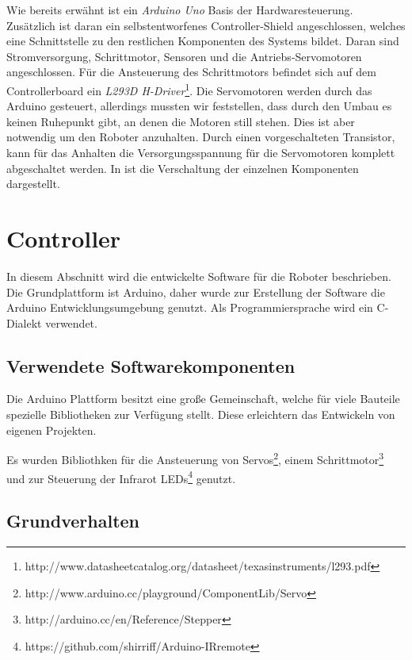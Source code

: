 \documentclass[12pt,a4paper,titlepage]{article}
\begin{document}
Wie bereits erwähnt ist ein \emph{Arduino Uno} Basis der Hardwaresteuerung. Zusätzlich ist daran ein selbstentworfenes Controller-Shield angeschlossen, welches eine Schnittstelle zu den restlichen Komponenten des Systems bildet. Daran sind Stromversorgung, Schrittmotor, Sensoren und die Antriebs-Servo\-motoren angeschlossen. Für die Ansteuerung des Schrittmotors befindet sich auf dem Controllerboard ein \emph{L293D H-Driver}\footnote{http://www.datasheetcatalog.org/datasheet/texasinstruments/l293.pdf}. Die Servomotoren werden durch das Arduino gesteuert, allerdings mussten wir feststellen, dass durch den Umbau es keinen Ruhepunkt gibt, an denen die Motoren still stehen. Dies ist aber notwendig um den Roboter anzuhalten. Durch einen vorgeschalteten Transistor, kann für das Anhalten die Versorgungsspannung für die Servomotoren komplett abgeschaltet werden. In  ist die Verschaltung der einzelnen Komponenten dargestellt.


\section{Controller}

In diesem Abschnitt wird die entwickelte Software für die Roboter beschrieben. Die Grundplattform ist Arduino, daher wurde zur Erstellung der Software die Arduino Entwicklungsumgebung genutzt. Als Programmiersprache wird ein C-Dialekt verwendet.

\subsection{Verwendete Softwarekomponenten}

Die Arduino Plattform besitzt eine große Gemeinschaft, welche für viele Bauteile spezielle Bibliotheken zur Verfügung stellt. Diese erleichtern das Entwickeln von eigenen Projekten.

Es wurden Bibliothken für die Ansteuerung von Servos\footnote{http://www.arduino.cc/playground/ComponentLib/Servo}, einem Schrittmotor\footnote{http://arduino.cc/en/Reference/Stepper} und zur Steuerung der Infrarot LEDs\footnote{https://github.com/shirriff/Arduino-IRremote} genutzt.

\subsection{Grundverhalten}
\end{document}
